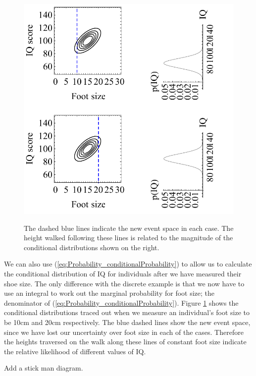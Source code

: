 \documentclass[11pt,fullpage]{book}
\begin{document}
\begin{figure}
\centering
\scalebox{0.5} 
{\includegraphics{Probability_footSizeIntelligenceConditional.pdf}}
\caption{The dashed blue lines indicate the new event space in each case. The height walked following these lines is related to the magnitude of the conditional distributions shown on the right.}\label{fig:Probability_footSizeIntelligenceConditional}
\end{figure}

We can also use (\ref{eq:Probability_conditionalProbability}) to allow us to calculate the conditional distribution of IQ for individuals after we have measured their shoe size. The only difference with the discrete example is that we now have to use an integral to work out the marginal probability for foot size; the denominator of (\ref{eq:Probability_conditionalProbability}). Figure \ref{fig:Probability_footSizeIntelligenceConditional} shows the conditional distributions traced out when we measure an individual's foot size to be 10cm and 20cm respectively. The blue dashed lines show the new event space, since we have lost our uncertainty over foot size in each of the cases. Therefore the heights traversed on the walk along these lines of constant foot size indicate the relative likelihood of different values of IQ. 

Add a stick man diagram.
\end{document}
